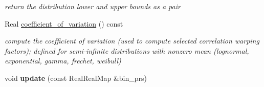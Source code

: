 \begin{DoxyCompactItemize}
\begin{DoxyCompactList}\small\item\em return the distribution lower and upper bounds as a pair \end{DoxyCompactList}\item 
Real \hyperlink{classPecos_1_1HistogramBinRandomVariable_ae1cf1c07047d7ad9dbb899aa01138d54}{coefficient\+\_\+of\+\_\+variation} () const 
\begin{DoxyCompactList}\small\item\em compute the coefficient of variation (used to compute selected correlation warping factors); defined for semi-\/infinite distributions with nonzero mean (lognormal, exponential, gamma, frechet, weibull) \end{DoxyCompactList}\item 
void {\bfseries update} (const Real\+Real\+Map \&bin\+\_\+prs)\label{classPecos_1_1HistogramBinRandomVariable_ae090ed665f667266b706e11c3b561043}

\end{DoxyCompactItemize}
